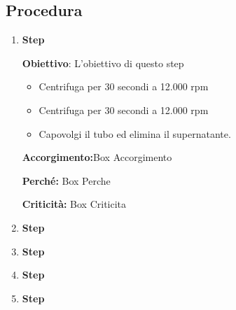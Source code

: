 \subsection{Procedura}
\begin{enumerate}
    \item \textbf{Step}
    
    {\footnotesize \textbf{Obiettivo}: L'obiettivo di questo step}

    \begin{itemize}
        \item Centrifuga per 30 secondi a 12.000 rpm
        \item Centrifuga per 30 secondi a 12.000 rpm
        \item Capovolgi il tubo ed elimina il supernatante.
    \end{itemize}

    \begin{accorgimentoBox}
    \textbf{Accorgimento:}Box Accorgimento
    \end{accorgimentoBox}

    \begin{percheBox}
    \textbf{Perché:} Box Perche
    \end{percheBox}

    \begin{criticitaBox}
    \textbf{Criticità:} Box Criticita
    \end{criticitaBox}

    \item \textbf{Step}
    \item \textbf{Step}
    \item \textbf{Step}
    \item \textbf{Step}
\end{enumerate}

